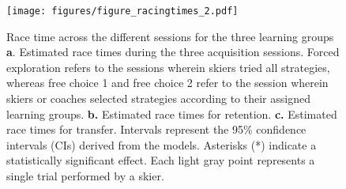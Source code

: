 \begin{figure}[H]
\centering
\texttt{[image: figures/figure\_racingtimes\_2.pdf]}
\caption{Race time across the different sessions for the three learning groups \textbf{a}. Estimated race times during the three acquisition sessions. Forced exploration refers to the sessions wherein skiers tried all strategies, whereas free choice 1 and free choice 2 refer to the session wherein skiers or coaches selected strategies according to their assigned learning groups. \textbf{b.} Estimated race times for retention. \textbf{c.} Estimated race times for transfer. Intervals represent the 95\% confidence intervals (CIs) derived from the models. Asterisks (*) indicate a statistically significant effect. Each light gray point represents a single trial performed by a skier.}
\label{fig: racetime}
\end{figure}
